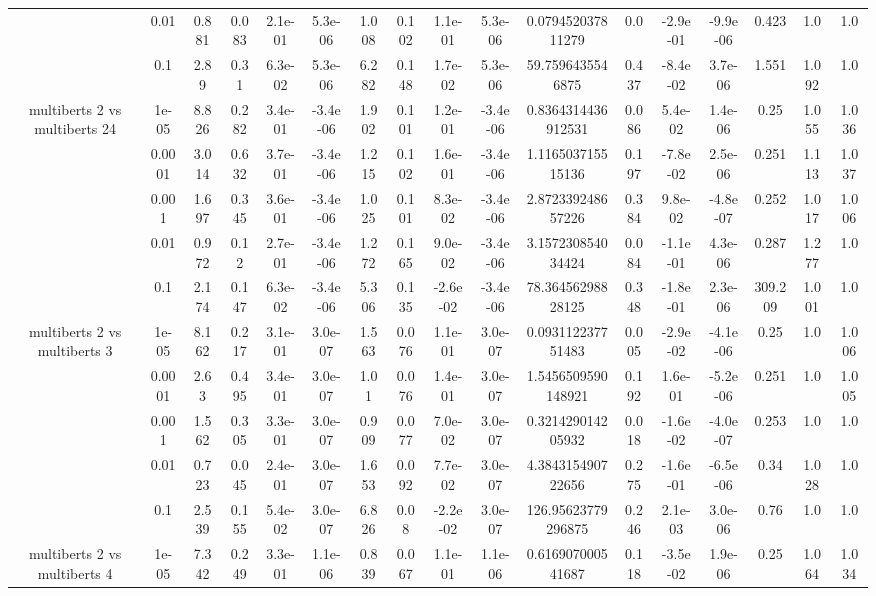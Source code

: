 \begin{tabular}{|c|c|c|c|c|c|c|c|c|c|c|c|c|c|c|c|c|}
 & 0.01 & 0.881 & 0.083 & 2.1e-01 & 5.3e-06 & 1.008 & 0.102 & 1.1e-01 & 5.3e-06 & 0.079452037811279 & 0.0 & -2.9e-01 & -9.9e-06 & 0.423 & 1.0 & 1.0 \\
 & 0.1 & 2.89 & 0.31 & 6.3e-02 & 5.3e-06 & 6.282 & 0.148 & 1.7e-02 & 5.3e-06 & 59.7596435546875 & 0.437 & -8.4e-02 & 3.7e-06 & 1.551 & 1.092 & 1.0 \\
\hline
\multirow{5}{*}{multiberts 2 vs multiberts 24} & 1e-05 & 8.826 & 0.282 & 3.4e-01 & -3.4e-06 & 1.902 & 0.101 & 1.2e-01 & -3.4e-06 & 0.8364314436912531 & 0.086 & 5.4e-02 & 1.4e-06 & 0.25 & 1.055 & 1.036 \\
 & 0.0001 & 3.014 & 0.632 & 3.7e-01 & -3.4e-06 & 1.215 & 0.102 & 1.6e-01 & -3.4e-06 & 1.116503715515136 & 0.197 & -7.8e-02 & 2.5e-06 & 0.251 & 1.113 & 1.037 \\
 & 0.001 & 1.697 & 0.345 & 3.6e-01 & -3.4e-06 & 1.025 & 0.101 & 8.3e-02 & -3.4e-06 & 2.872339248657226 & 0.384 & 9.8e-02 & -4.8e-07 & 0.252 & 1.017 & 1.006 \\
 & 0.01 & 0.972 & 0.12 & 2.7e-01 & -3.4e-06 & 1.272 & 0.165 & 9.0e-02 & -3.4e-06 & 3.157230854034424 & 0.084 & -1.1e-01 & 4.3e-06 & 0.287 & 1.277 & 1.0 \\
 & 0.1 & 2.174 & 0.147 & 6.3e-02 & -3.4e-06 & 5.306 & 0.135 & -2.6e-02 & -3.4e-06 & 78.36456298828125 & 0.348 & -1.8e-01 & 2.3e-06 & 309.209 & 1.001 & 1.0 \\
\hline
\multirow{5}{*}{multiberts 2 vs multiberts 3} & 1e-05 & 8.162 & 0.217 & 3.1e-01 & 3.0e-07 & 1.563 & 0.076 & 1.1e-01 & 3.0e-07 & 0.093112237751483 & 0.005 & -2.9e-02 & -4.1e-06 & 0.25 & 1.0 & 1.006 \\
 & 0.0001 & 2.63 & 0.495 & 3.4e-01 & 3.0e-07 & 1.01 & 0.076 & 1.4e-01 & 3.0e-07 & 1.5456509590148921 & 0.192 & 1.6e-01 & -5.2e-06 & 0.251 & 1.0 & 1.005 \\
 & 0.001 & 1.562 & 0.305 & 3.3e-01 & 3.0e-07 & 0.909 & 0.077 & 7.0e-02 & 3.0e-07 & 0.321429014205932 & 0.018 & -1.6e-02 & -4.0e-07 & 0.253 & 1.0 & 1.0 \\
 & 0.01 & 0.723 & 0.045 & 2.4e-01 & 3.0e-07 & 1.653 & 0.092 & 7.7e-02 & 3.0e-07 & 4.384315490722656 & 0.275 & -1.6e-01 & -6.5e-06 & 0.34 & 1.028 & 1.0 \\
 & 0.1 & 2.539 & 0.155 & 5.4e-02 & 3.0e-07 & 6.826 & 0.08 & -2.2e-02 & 3.0e-07 & 126.95623779296875 & 0.246 & 2.1e-03 & 3.0e-06 & 0.76 & 1.0 & 1.0 \\
\hline
\multirow{5}{*}{multiberts 2 vs multiberts 4} & 1e-05 & 7.342 & 0.249 & 3.3e-01 & 1.1e-06 & 0.839 & 0.067 & 1.1e-01 & 1.1e-06 & 0.616907000541687 & 0.118 & -3.5e-02 & 1.9e-06 & 0.25 & 1.064 & 1.034 \\

\end{tabular}
